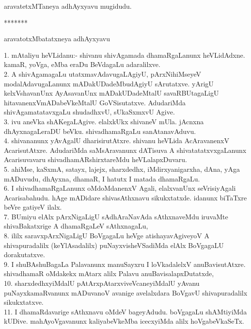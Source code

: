 \documentclass{article}
\begin{document}
\begin{center}
aravatetxMTaneya adhAyxyavu mugidudu.
\end{center}

\begin{center}
*******
\end{center}

\begin{center}
aravatotxMbatatxneya adhAyxyavu
\end{center}

1. mAtaliyu heVLidanu:- shivanu shivAgamada dhamaRgaLanunx heVLidAdxne. kamaR, yoVga, eMba eraDu BeVdagaLu adaralilxve.\\
2. A shivAgamagaLu utatxmavAdavugaLAgiyU, pArxNihiMseyeV modalAdavugaLanunx mADakUDadeMbudAgiyU sArutatxve. yArigU kelxVshavanUnx AyAsavanUnx mADakUDadeMtalU savaRBUtagaLigU hitavanenxVmADabeVkeMtalU GoVSisutatxve. AdudariMda shivAgamatatavxgaLu shudadhxvU, sUkaSxmxvU Agive.\\
3. ivu aneVka shAKegaLAgive. elalxkUkx shivaneV mUla. jAcnxna dhAyxnagaLeraDU beVku. shivadhamaRgaLu sanAtanavAduvu.\\
4. shivananunx yAvAgalU dharisirutAtxre. shivanu heVLida AcAravanenxV AcarisutAtxre. AdudariMda saMsAravanunx dATisuva A shivatatatxvxgaLanunx Acarisuvavaru shivadhamARshirxtareMdu heVLalapxDuvaru.\\
5. ahiMse, kaSxmA, satayx, lajejx, sharxdedhx, iMdirxyanigarxha, dAna, yAga mADuvudu, dhAyxna, dhamaR, I hatutx I matada dhamaRgaLu.\\
6. I shivadhamaRgaLanunx oMdoMdanenxV Agali, elalxvanUnx seVrisiyAgali Acarisabahudu. hAge mADidare shivasAthxnavu sikukxtatxde. idanunx biTaTxre beVre gatiyeV ilalx.\\
7. BUmiyu elAlx pArxNigaLigU sAdhAraNavAda sAthxnaveMdu iruvaMte shivaBakatxrige A dhamaRgaLeV sAthxnagaLu,\\
8. ililx saravxpArxNigaLigU BoVgagaLu heVge atishayavAgiveyoV A shivapuradalilx (keYlAsadalilx) puNayxvisheVSadiMda elAlx BoVgagaLU dorakutatxve.\\
9. I shuBAshuBagaLa Palavanunx manuSayxru I loVkadalelxV anuBavisutAtxre. shivadhamaR oMdakekx mAtarx alilx Palavu anuBavisalapxDutatxde,\\
10. sharxdedhxyiMdalU pAtArxpAtarxviveVcaneyiMdalU yAvanu puNayxkamaRvanunx mADuvanoV avanige avelalxdara BoVgavU shivapuradalilx sikukxtatxve.\\
11. I dhamaRdavarige sAthxnavu oMdeV bageyAdudu. boVgagaLu shAMtiyiMda kUDive. mahAyoVgavanunx kaliyabeVkeMba icecxyiMda alilx hoVgabeVkaSeTx.\\
\end{document}
